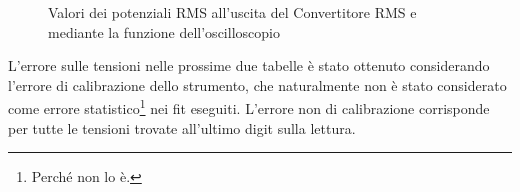 \documentclass[a4paper,10pt]{article}
\begin{document}
\begin{table}[H]
	\centering
	
	\caption{Dati acquisiti per la risposta in frequenza della prima parte del preamplificatore.}
	\label{tab:prepreamp}
\end{table}

\begin{table}[H]
	\centering
	
	\caption{Dati acquisiti per la risposta in frequenza della seconda parte del preamplificatore.}
	\label{tab:postpreamp}
\end{table}

\begin{figure}
	\begin{minipage}{0.64\textwidth}
		\begin{table}[H]
			\centering
			
			\caption{Dati acquisiti per la risposta in frequenza del passabanda.}
			\label{tab:bandpass}
		\end{table}
	\end{minipage}
	\begin{minipage}{0.34\textwidth}
		\begin{table}[H]
			\centering
			
			\caption{Valori dei potenziali RMS all'uscita del Convertitore RMS e mediante la funzione dell'oscilloscopio}
			\label{tab:RMScal}
		\end{table}
	\end{minipage}
\end{figure}

\begin{table}[H]
	\centering
	
	\caption{Valori delle frequenze utilizzate e del potenziale in uscita al circuito utilizzando un partitore 1000:1.}
	\label{tab:totamp}
\end{table}

\pagebreak

L'errore sulle tensioni nelle prossime due tabelle è stato ottenuto considerando l'errore di calibrazione dello strumento, che naturalmente non è stato considerato come errore statistico\footnote{Perché non lo è.} nei fit eseguiti.
L'errore non di calibrazione corrisponde per tutte le tensioni trovate all'ultimo digit sulla lettura.

\begin{table}[H]
	\centering
	
	\caption{Valori delle resistenze utilizzate e del potenziale all'uscita del circuito.}
	\label{tab:lastfit}
\end{table}

\begin{table}[H]
	\centering
	
	\caption{Valori delle resistenze utilizzate e del potenziale all'uscita del circuito.}
	\label{tab:lastfit1}
\end{table}
\end{document}
